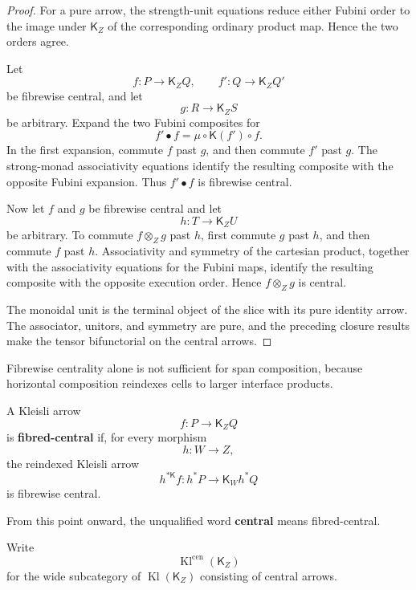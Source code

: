 \begin{proof}
For a pure arrow, the strength-unit equations reduce either Fubini order to
the image under \(\mathsf K_Z\) of the corresponding ordinary product map.
Hence the two orders agree.

Let
\[
    f:P\to\mathsf K_ZQ,
    \qquad
    f':Q\to\mathsf K_ZQ'
\]
be fibrewise central, and let
\[
    g:R\to\mathsf K_ZS
\]
be arbitrary.  Expand the two Fubini composites for
\[
    f'\mathbin{\bullet}f
    =
    \mu\circ\mathsf K(f')\circ f.
\]
In the first expansion, commute \(f\) past \(g\), and then commute \(f'\)
past \(g\).  The strong-monad associativity equations identify the resulting
composite with the opposite Fubini expansion.  Thus
\(f'\mathbin{\bullet}f\) is fibrewise central.

Now let \(f\) and \(g\) be fibrewise central and let
\[
    h:T\to\mathsf K_ZU
\]
be arbitrary.  To commute \(f\otimes_Zg\) past \(h\), first commute \(g\)
past \(h\), and then commute \(f\) past \(h\).  Associativity and symmetry of
the cartesian product, together with the associativity equations for the
Fubini maps, identify the resulting composite with the opposite execution
order.  Hence \(f\otimes_Zg\) is central.

The monoidal unit is the terminal object of the slice with its pure identity
arrow.  The associator, unitors, and symmetry are pure, and the preceding
closure results make the tensor bifunctorial on the central arrows.
\end{proof}

Fibrewise centrality alone is not sufficient for span composition, because
horizontal composition reindexes cells to larger interface products.

\begin{definition}
\label{def:fibred-central-kleisli-arrow}
A Kleisli arrow
\[
    f:P\longrightarrow\mathsf K_ZQ
\]
is \textbf{fibred-central} if, for every morphism
\[
    h:W\to Z,
\]
the reindexed Kleisli arrow
\[
    h^{*\mathsf K}f:
    h^*P\longrightarrow\mathsf K_Wh^*Q
\]
is fibrewise central.

From this point onward, the unqualified word \textbf{central} means
fibred-central.
\end{definition}

Write
\[
    \operatorname{Kl}^{\mathrm{cen}}(\mathsf K_Z)
\]
for the wide subcategory of \(\operatorname{Kl}(\mathsf K_Z)\) consisting of
central arrows.

